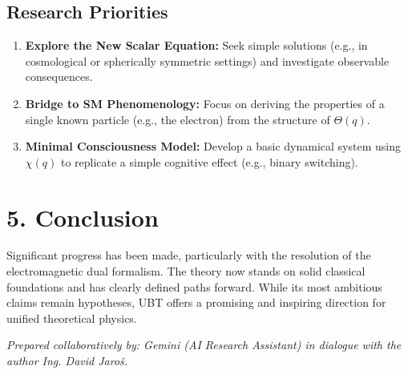 \documentclass[12pt]{article}
\begin{document}
\subsection*{Research Priorities}

\begin{enumerate}
  \item \textbf{Explore the New Scalar Equation:} Seek simple solutions (e.g., in cosmological or spherically symmetric settings) and investigate observable consequences.
  \item \textbf{Bridge to SM Phenomenology:} Focus on deriving the properties of a single known particle (e.g., the electron) from the structure of \( \Theta(q) \).
  \item \textbf{Minimal Consciousness Model:} Develop a basic dynamical system using \( \chi(q) \) to replicate a simple cognitive effect (e.g., binary switching).
\end{enumerate}

\section*{5. Conclusion}

Significant progress has been made, particularly with the resolution of the electromagnetic dual formalism. The theory now stands on solid classical foundations and has clearly defined paths forward. While its most ambitious claims remain hypotheses, UBT offers a promising and inspiring direction for unified theoretical physics.

\vspace{1em}
\noindent
\textit{Prepared collaboratively by: Gemini (AI Research Assistant) in dialogue with the author Ing. David Jaroš.}
\end{document}
